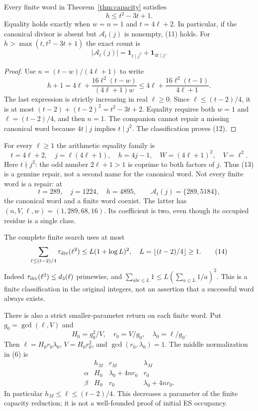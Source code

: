 \begin{theorem}\label{thm:bound}
Every finite word in Theorem~\ref{thm:capacity} satisfies
\[
 \boxed{h\le t^2-3t+1.}                                \tag{11}
\]
Equality holds exactly when $w=n=1$ and $t=4\ell+2$. In particular, if the
canonical divisor is absent but $\mathcal A_t(j)$ is nonempty, (11) holds.
For $h>\max(t,t^2-3t+1)$ the exact count is
\[
 \boxed{|\mathcal A_t(j)|=
  \mathbf1_{t\mid j^2}+\mathbf1_{4t\mid j}.}             \tag{12}
\]
\end{theorem}
\begin{proof}
Use $n=(t-w)/(4\ell+1)$ to write
\[
 h+1=4\ell+\frac{16\ell^2(t-w)}{(4\ell+1)w}
 \le4\ell+\frac{16\ell^2(t-1)}{4\ell+1}.
\]
The last expression is strictly increasing in real $\ell\ge0$. Since
$\ell\le(t-2)/4$, it is at most
$(t-2)+(t-2)^2=t^2-3t+2$. Equality requires both $w=1$ and
$\ell=(t-2)/4$, and then $n=1$. The companion cannot repair a missing canonical
word because $4t\mid j$ implies $t\mid j^2$. The classification proves (12).
\end{proof}

For every $\ell\ge1$ the arithmetic equality family is
\[
 t=4\ell+2,\quad j=\ell(4\ell+1),\quad h=4j-1,
 \quad W=(4\ell+1)^2,\quad V=\ell^2.                    \tag{13}
\]
Here $t\nmid j^2$: the odd number $2\ell+1>1$ is coprime to both factors of
$j$. Thus (13) is a genuine repair, not a second name for the canonical word.
Not every finite word is a repair: at
\[
 t=289,\quad j=1224,\quad h=4895,
 \qquad\mathcal A_t(j)=\{289,5184\},
\]
the canonical word and a finite word coexist. The latter has
$(n,V,\ell,w)=(1,289,68,16)$. Its coefficient is two, even though its occupied
residue is a single class.

The complete finite search uses at most
\[
 \sum_{\ell\le(t-2)/4}\tau_{\rm div}(\ell^2)
 \le L(1+\log L)^2,\quad L=\lfloor(t-2)/4\rfloor\ge1.   \tag{14}
\]
Indeed $\tau_{\rm div}(\ell^2)\le d_3(\ell)$ primewise, and
$\sum_{abc\le L}1\le L(\sum_{a\le L}1/a)^2$. This is a finite classification
in the original integers, not an assertion that a successful word always exists.

There is also a strict smaller-parameter return on each finite word. Put
$g_0=\gcd(\ell,V)$ and
\[
 H_0=g_0^2/V,\quad r_0=V/g_0,\quad \lambda_0=\ell/g_0.
\]
Then $\ell=H_0r_0\lambda_0$, $V=H_0r_0^2$, and $\gcd(r_0,\lambda_0)=1$.
The middle normalization in (6) is
\[
 \begin{array}{c|ccc}
 &h_M&r_M&\lambda_M\\\hline
 \alpha&H_0&\lambda_0+4nr_0&r_0\\
 \beta&H_0&r_0&\lambda_0+4nr_0.
 \end{array}                                           \tag{15}
\]
In particular $h_M\le\ell\le(t-2)/4$. This decreases a parameter of the
finite capacity reduction; it is not a well-founded proof of initial ES occupancy.

